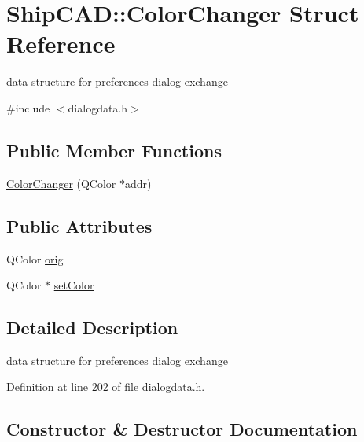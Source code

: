 \hypertarget{structShipCAD_1_1ColorChanger}{}\section{Ship\+C\+AD\+:\+:Color\+Changer Struct Reference}
\label{structShipCAD_1_1ColorChanger}


data structure for preferences dialog exchange  




{\ttfamily \#include $<$dialogdata.\+h$>$}

\subsection*{Public Member Functions}
\begin{DoxyCompactItemize}
\item 
\hyperlink{structShipCAD_1_1ColorChanger_a21709f0ab068edb101c03122cc3a187c}{Color\+Changer} (Q\+Color $\ast$addr)
\end{DoxyCompactItemize}
\subsection*{Public Attributes}
\begin{DoxyCompactItemize}
\item 
Q\+Color \hyperlink{structShipCAD_1_1ColorChanger_ab9a1ad436c2f88dc98ca0df0c6954629}{orig}
\item 
Q\+Color $\ast$ \hyperlink{structShipCAD_1_1ColorChanger_a02791ae9fddb3e9a97ff84ae65b8e76e}{set\+Color}
\end{DoxyCompactItemize}


\subsection{Detailed Description}
data structure for preferences dialog exchange 

Definition at line 202 of file dialogdata.\+h.



\subsection{Constructor \& Destructor Documentation}
